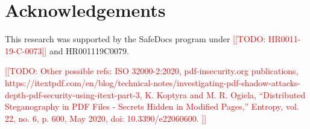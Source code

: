 \documentclass[conference,12pt]{IEEEtran}
\newcommand{\note}[1]{\noteYes{#1}}
\newcommand{\noteYes}[1]{\textcolor{red}{[[#1]]}}
\newcommand{\todo}[1]{\note{TODO: #1}}
\begin{document}
\section*{Acknowledgements}

This research was supported by the SafeDocs program under \todo{HR0011-19-C-0073} and HR001119C0079.




% 
\todo{Other possible refs: ISO 32000-2:2020, pdf-insecurity.org publications, https://itextpdf.com/en/blog/technical-notes/investigating-pdf-shadow-attacks-depth-pdf-security-using-itext-part-3, K. Koptyra and M. R. Ogiela, “Distributed Steganography in PDF Files - Secrets Hidden in Modified Pages,” Entropy, vol. 22, no. 6, p. 600, May 2020, doi: 10.3390/e22060600.
}
\end{document}
